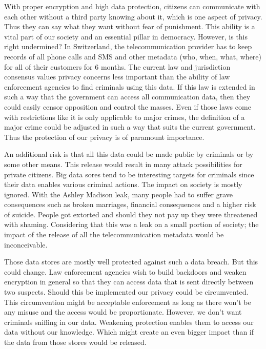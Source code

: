 \documentclass[12pt]{article}
\begin{document}
With proper encryption and high data protection, citizens can communicate with each other without a third party knowing about it, which is one aspect of privacy. Thus they can say what they want without fear of punishment. This ability is a vital part of our society and an essential pillar in democracy. However, is this right undermined? In Switzerland, the telecommunication provider has to keep records of all phone calls and SMS and other metadata (who, when, what, where) for all of their customers for 6 months. The current law and jurisdiction consensus values privacy concerns less important than the ability of law enforcement agencies to find criminals using this data.\cite{randdatenTele} If this law is extended in such a way that the government can access all communication data, then they could easily censor opposition and control the masses. Even if those laws come with restrictions like it is only applicable to major crimes, the definition of a major crime could be adjusted in such a way that suits the current government. Thus the protection of our privacy is of paramount importance. \cite{guardianPrivacyTotalitarianState}

An additional risk is that all this data could be made public by criminals or by some other means. This release would result in many attack possibilities for private citizens. Big data sores tend to be interesting targets for criminals since their data enables various criminal actions. The impact on society is mostly ignored. With the Ashley Madison leak, many people had to suffer grave consequences such as broken marriages, financial consequences and a higher risk of suicide. \cite{ashleyGeneral}  People got extorted and should they not pay up they were threatened with shaming. \cite{ashleyGuy}  Considering that this was a leak on a small portion of society; the impact of the release of all the telecommunication metadata would be inconceivable. 

Those data stores are mostly well protected against such a data breach. But this could change. Law enforcement agencies wish to build backdoors and weaken encryption in general so that they can access data that is sent directly between two suspects. Should this be implemented our privacy could be circumvented. This circumvention might be acceptable enforcement as long as there won't be any misuse and the access would be proportionate. However, we don't want criminals sniffing in our data. Weakening protection enables them to access our data without our knowledge. Which might create an even bigger impact than if the data from those stores would be released. \cite{roundtable}
\end{document}
